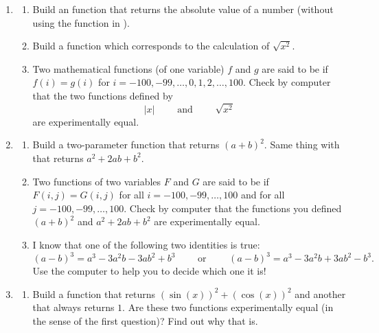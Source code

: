 \documentclass[11pt,class=report,crop=false]{standalone}
\begin{document}
\begin{activite}


\begin{enumerate}
  \item
  \begin{enumerate}
    \item Build an  function that returns the absolute value of a number (without using the function  in \Python{}).

    \item Build a function  which corresponds to the calculation of $\sqrt{x^2}$.

  
  \item Two mathematical functions (of one variable) $f$ and $g$ are said to be  if $f(i)=g(i)$ for $i=-100,-99,\ldots,0,1,2,\ldots,100$. Check by computer that the two functions defined by
  $$|x| \qquad \text{ and } \qquad \sqrt{x^2}$$
  are experimentally equal. 
  
  \end{enumerate}
  
  \item
    \begin{enumerate}
    \item Build a two-parameter function  that returns $(a+b)^2$. Same thing with  that returns $a^2+2ab+b^2$.
 
  \item Two functions of two variables $F$ and $G$ are said to be  if $F(i,j)=G(i,j)$ for all $i=-100,-99,\ldots,100$ and for all $j = -100,-99,\ldots,100$. Check by computer that the functions you defined $(a+b)^2$ and $a^2+2ab+b^2$ are experimentally equal. 
  
   \item I know that one of the following two identities is true:
   $$(a-b)^3 = a^3 - 3a^2b -3ab^2+b^3 \qquad \text{ or } \qquad (a-b)^3 = a^3 - 3a^2b  + 3ab^2 - b^3.$$
   Use the computer to help you to decide which one it is!
   
  \end{enumerate} 
  
  \item 
   \begin{enumerate}
    \item Build a function  that returns $(\sin(x))^2 + (\cos(x))^2$ and another  that always returns $1$. Are these two functions experimentally equal (in the sense of the first question)? Find out why that is.
    

\end{enumerate}
\end{enumerate}
\end{activite}
\end{document}
